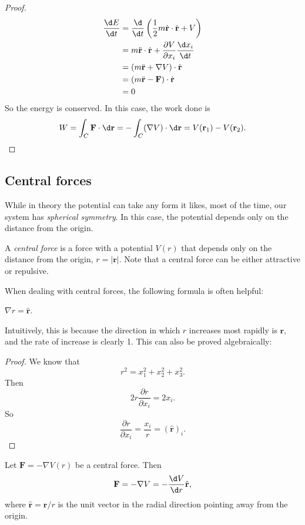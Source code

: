 \documentclass[a4paper]{article}
\begin{document}
\begin{proof}
  \begin{align*}
    \frac{\d E}{\d t} &= \frac{\d}{\d t}\left(\frac{1}{2}m\dot{\mathbf{r}}\cdot \dot{\mathbf{r}} + V\right)\\
    &= m\ddot{\mathbf{r}}\cdot \dot{\mathbf{r}} + \frac{\partial V}{\partial x_i}\frac{\d x_i}{\d t}\\
    &= (m\ddot{\mathbf{r}} + \nabla V)\cdot \dot{\mathbf{r}}\\
    &= (m\ddot{\mathbf{r}} - \mathbf{F})\cdot \dot{\mathbf{r}}\\
    &= 0
  \end{align*}
  So the energy is conserved. In this case, the work done is
  \[
    W = \int_C \mathbf{F}\cdot \d \mathbf{r} = -\int_C (\nabla V)\cdot \d \mathbf{r} = V(\mathbf{r}_1) - V(\mathbf{r}_2).
  \]
\end{proof}
\subsection{Central forces}
While in theory the potential can take any form it likes, most of the time, our system has \emph{spherical symmetry}. In this case, the potential depends only on the distance from the origin.
\begin{defi}
  A \emph{central force} is a force with a potential $V(r)$ that depends only on the distance from the origin, $r = |\mathbf{r}|$. Note that a central force can be either attractive or repulsive.
\end{defi}

When dealing with central forces, the following formula is often helpful:
\begin{prop}
  $\nabla r = \hat{\mathbf{r}}$.
\end{prop}
Intuitively, this is because the direction in which $r$ increases most rapidly is $\mathbf{r}$, and the rate of increase is clearly 1. This can also be proved algebraically:

\begin{proof}
  We know that
  \[
    r^2 = x_1^2 + x_2^2 + x_3^2.
  \]
  Then
  \[
    2r\frac{\partial r}{\partial x_i} = 2x_i.
  \]
  So
  \[
    \frac{\partial r}{\partial x_i} = \frac{x_i}{r} = (\hat{\mathbf{r}})_i.
  \]
\end{proof}

\begin{prop}
  Let $\mathbf{F} = -\nabla V(r)$ be a central force. Then
  \[
    \mathbf{F} = -\nabla V = -\frac{\d V}{\d r} \hat{\mathbf{r}},
  \]
  where $\hat{\mathbf{r}} = \mathbf{r}/r$ is the unit vector in the radial direction pointing away from the origin.
\end{prop}
\end{document}
